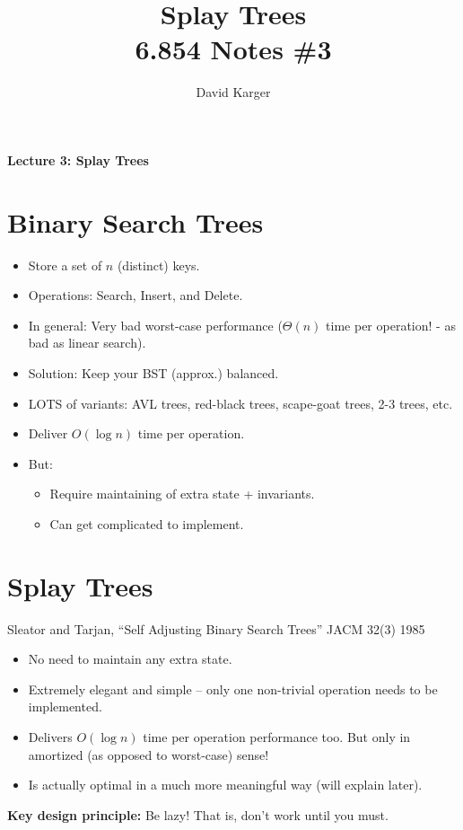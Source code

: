 \documentclass{article}
\title{Splay Trees\\ 6.854 Notes \#3}
\author{David Karger}
\begin{document}

\begin{center}
{\bf  Lecture 3: Splay Trees}
\end{center}

\section{Binary Search Trees}

\begin{itemize}
\item Store a set of $n$ (distinct) keys.
\item Operations: Search, Insert, and Delete.
\item In general: Very bad worst-case performance ($\Theta(n)$ time per operation! - as bad as linear search).
\item Solution: Keep your BST (approx.) balanced.
\item LOTS of variants: AVL trees, red-black trees, scape-goat trees, 2-3 trees, etc.
\item Deliver $O(\log n)$ time per operation.
\item But: 
\begin{itemize}
\item Require maintaining of extra state + invariants.
\item Can get complicated to implement.
\end{itemize} 
\end{itemize}

\section{Splay Trees}

Sleator and Tarjan, ``Self Adjusting Binary Search Trees'' JACM 32(3)
1985


\begin{itemize}
\item No need to maintain any extra state.
\item Extremely elegant and simple -- only one non-trivial operation needs to be implemented.
\item Delivers $O(\log n)$ time per operation performance too. But only in amortized (as opposed to worst-case) sense!
\item Is actually optimal in a much more meaningful way (will explain later).
\end{itemize}

{\bf Key design principle:} Be lazy! That is, don't work until you must. 
\end{document}
